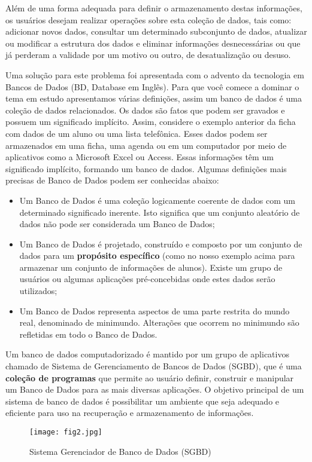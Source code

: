 \documentclass{article}
\begin{document}
Além de uma forma adequada para definir o armazenamento destas informações, os usuários desejam realizar operações sobre esta coleção de dados, tais como: adicionar novos dados, consultar um determinado subconjunto de dados, atualizar ou modificar a estrutura dos dados e eliminar informações desnecessárias ou que já perderam a validade por um motivo ou outro, de desatualização ou desuso.

Uma solução para este problema foi apresentada com o advento da tecnologia em Bancos de Dados (BD, Database em Inglês). Para que você comece a dominar o tema em estudo apresentamos várias definições, assim um banco de dados é uma coleção de dados relacionados. Os dados são fatos que podem ser gravados e possuem um significado implícito. Assim, considere o exemplo anterior da ficha com dados de um aluno ou uma lista telefônica. Esses dados podem ser armazenados em uma ficha, uma agenda ou em um computador por meio de aplicativos como a Microsoft Excel ou Access. Essas informações têm um significado implícito, formando um banco de dados. Algumas definições mais precisas de Banco de Dados podem ser conhecidas abaixo:
\begin{itemize}
    \item Um Banco de Dados é uma coleção logicamente coerente de dados com um determinado significado inerente. Isto significa que um conjunto aleatório de dados não pode ser considerada um Banco de Dados;
    \item Um Banco de Dados é projetado, construído e composto por um conjunto de dados para um \textbf{propósito específico} (como no nosso exemplo acima para armazenar um conjunto de informações de alunos). Existe um grupo de usuários ou algumas aplicações pré-concebidas onde estes dados serão utilizados;
    \item Um Banco de Dados representa aspectos de uma parte restrita do mundo real, denominado de minimundo. Alterações que ocorrem no minimundo são refletidas em todo o Banco de Dados.
\end{itemize}

Um banco de dados computadorizado é mantido por um grupo de aplicativos chamado de Sistema de Gerenciamento de Bancos de Dados (SGBD), que é uma \textbf{coleção de programas} que permite ao usuário definir, construir e manipular um Banco de Dados para as mais diversas aplicações. O objetivo principal de um sistema de banco de dados é possibilitar um ambiente que seja adequado e eficiente para uso na recuperação e armazenamento de informações.
\begin{figure}[h]
    \centering
    \texttt{[image: fig2.jpg]}
    \caption{Sistema Gerenciador de Banco de Dados (SGBD)}
    \label{fig:fig2}
\end{figure}
\end{document}
